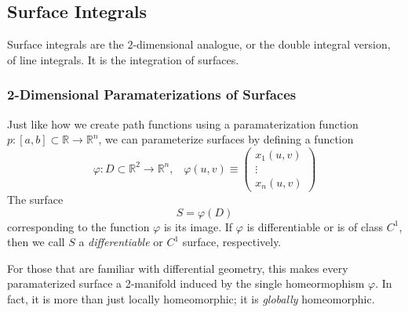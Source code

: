 \subsection{Surface Integrals}

  Surface integrals are the $2$-dimensional analogue, or the double integral version, of line integrals. It is the integration of surfaces. 

\subsubsection{2-Dimensional Paramaterizations of Surfaces}

  Just like how we create path functions using a paramaterization function $p: [a, b] \subset \mathbb{R} \longrightarrow \mathbb{R}^n$, we can parameterize surfaces by defining a function 
	\begin{equation}
  	\varphi: D \subset \mathbb{R}^2 \longrightarrow \mathbb{R}^n, \;\;\; \varphi (u, v) \equiv \begin{pmatrix} x_1 (u, v) \\ \vdots \\ x_n (u, v) \end{pmatrix}
	\end{equation}
  The surface 
	\begin{equation}
  	S = \varphi(D)
	\end{equation}
  corresponding to the function $\varphi$ is its image. If $\varphi$ is differentiable or is of class $C^1$, then we call $S$ a \textit{differentiable} or $C^1$ surface, respectively. 

  For those that are familiar with differential geometry, this makes every paramaterized surface a 2-manifold induced by the single homeormophism $\varphi$. In fact, it is more than just locally homeomorphic; it is \textit{globally} homeomorphic. 



